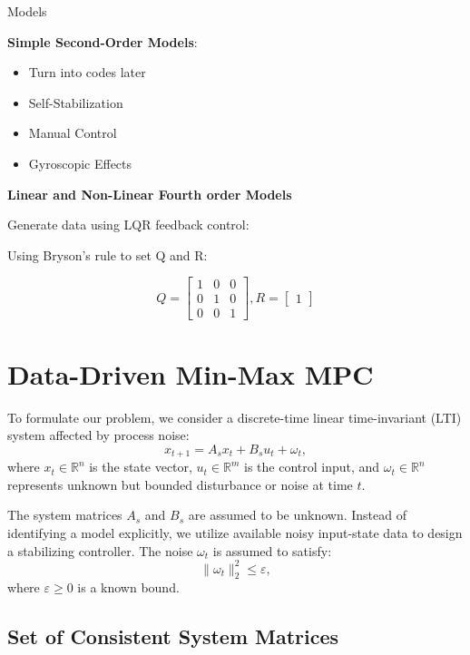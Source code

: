 	Models \cite{astrom2005bicycle}

	\textbf{Simple Second-Order Models}:

	\begin{itemize}
		\item Turn into codes later
		\item Self-Stabilization
		\item Manual Control
		\item Gyroscopic Effects
	\end{itemize}

	\textbf{Linear and Non-Linear Fourth order Models}

	Generate data using LQR feedback control:

	Using Bryson's rule to set Q and R:

	\begin{equation}
		Q = \begin{bmatrix}
			1 & 0 & 0 \\
			0 & 1 & 0 \\
			0 & 0 & 1
		\end{bmatrix},
		R = \begin{bmatrix}
			1
		\end{bmatrix}
	\end{equation}




\section{Data-Driven Min-Max MPC}
\label{sec:data_driven_mpc}

To formulate our problem, we consider a discrete-time linear time-invariant (LTI) system affected by process noise:
\[
x_{t+1} = A_s x_t + B_s u_t + \omega_t,
\]
where \(x_t \in \mathbb{R}^n\) is the state vector, \(u_t \in \mathbb{R}^m\) is the control input, and \(\omega_t \in \mathbb{R}^n\) represents unknown but bounded disturbance or noise at time \(t\).

The system matrices \(A_s\) and \(B_s\) are assumed to be unknown.
Instead of identifying a model explicitly, we utilize available noisy input-state data to design a stabilizing controller.
The noise \(\omega_t\) is assumed to satisfy:
\[
\|\omega_t\|_2^2 \leq \varepsilon,
\]
where \(\varepsilon \geq 0\) is a known bound.

\subsection{Set of Consistent System Matrices}

